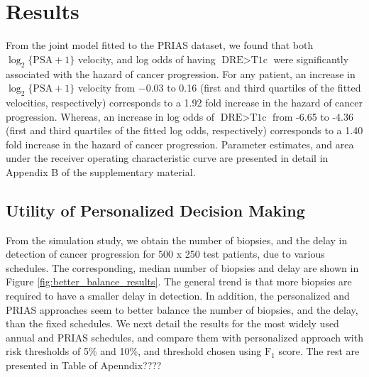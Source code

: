 
\section{Results}
\label{sec:results}
From the joint model fitted to the PRIAS dataset, we found that both $\log_2 \{\mbox{PSA} + 1\}$ velocity,  and log odds of having $\mbox{DRE} > \mbox{T1c}$  were significantly associated with the hazard of cancer progression. For any patient, an increase in $\log_2 \{\mbox{PSA} + 1\}$ velocity from −0.03 to 0.16 (first and third quartiles of the fitted velocities, respectively) corresponds to a 1.92 fold increase in the hazard of cancer progression. Whereas, an increase in log odds of $\mbox{DRE} > \mbox{T1c}$ from -6.65 to -4.36 (first and third quartiles of the fitted log odds, respectively) corresponds to a 1.40 fold increase in the hazard of cancer progression. Parameter estimates, and area under the receiver operating characteristic curve are presented in detail in Appendix B of the supplementary material.

\subsection{Utility of Personalized Decision Making}
From the simulation study, we obtain the number of biopsies, and the delay in detection of cancer progression for 500 x 250 test patients, due to various schedules. The corresponding, median number of biopsies and delay are shown in Figure \ref{fig:better_balance_results}. The general trend is that more biopsies are required to have a smaller delay in detection. In addition, the personalized and PRIAS approaches seem to better balance the number of biopsies, and the delay, than the fixed schedules. We next detail the results for the most widely used annual and PRIAS schedules, and compare them with personalized approach with risk thresholds of 5\% and 10\%, and threshold chosen using $\mbox{F}_1$ score. The rest are presented in Table of Apenndix????

